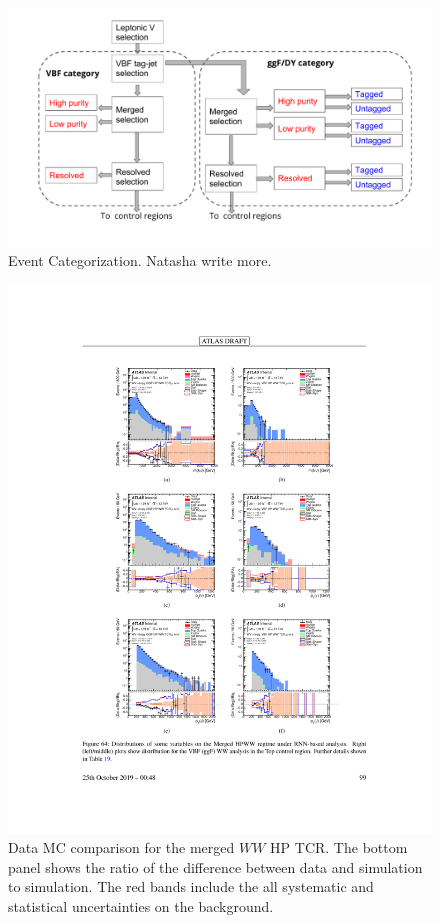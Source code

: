 \begin{figure}[h!]
  \centering
  \includegraphics[width=\hsize]{figures/Analysis/cutflow.pdf}  
  \caption{Event Categorization. Natasha write more.} 

  \label{fig:cutflow}
\end{figure} 
\FloatBarrier


\begin{figure}[h!]
  \centering
  \includegraphics[width=\hsize , height=\textheight , keepaspectratio]{figures/Analysis/datamc/merged_hp_ww_tcr.pdf}
    \caption{Data MC comparison for the merged $WW$ HP TCR. The bottom panel shows the ratio of the difference between data and simulation to simulation. The red bands include the all systematic and statistical uncertainties on the background. } 
  \label{fig:merged_hp_ww_TCR_datamc}
\end{figure} 
\FloatBarrier


